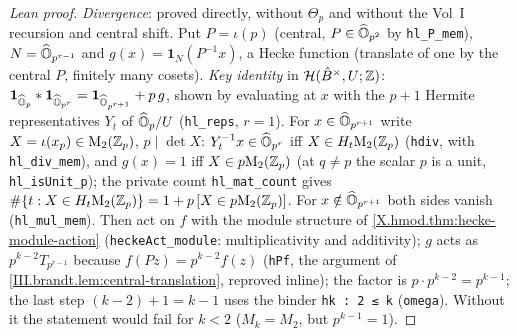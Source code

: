 \begin{proof}[Lean proof]
\emph{Divergence}: proved directly, without $\Theta_p$ and without the Vol~I recursion and central shift. Put $P=\iota(p)$ (central, $P\in\widehat{\mathbb{O}}_{p^2}$ by \texttt{hl\_P\_mem}), $N=\widehat{\mathbb{O}}_{p^{r-1}}$ and $g(x)=\mathbf 1_N(P^{-1}x)$, a Hecke function (translate of one by the central $P$, finitely many cosets). \emph{Key identity} in $\mathcal H(\hat B^\times,U;\mathbb{Z})$: $\mathbf 1_{\widehat{\mathbb{O}}_p}*\mathbf 1_{\widehat{\mathbb{O}}_{p^r}}=\mathbf 1_{\widehat{\mathbb{O}}_{p^{r+1}}}+p\,g$, shown by evaluating at $x$ with the $p+1$ Hermite representatives $Y_t$ of $\widehat{\mathbb{O}}_p/U$ (\texttt{hl\_reps}, $r=1$). For $x\in\widehat{\mathbb{O}}_{p^{r+1}}$ write $X=\iota(x_p)\in\mathrm{M}_2(\mathbb{Z}_p)$, $p\mid\det X$: $Y_t^{-1}x\in\widehat{\mathbb{O}}_{p^r}$ iff $X\in H_t\mathrm{M}_2(\mathbb{Z}_p)$ (\texttt{hdiv}, with \texttt{hl\_div\_mem}), and $g(x)=1$ iff $X\in p\mathrm{M}_2(\mathbb{Z}_p)$ (at $q\neq p$ the scalar $p$ is a unit, \texttt{hl\_isUnit\_p}); the private count \texttt{hl\_mat\_count} gives $\#\{t:X\in H_t\mathrm{M}_2(\mathbb{Z}_p)\}=1+p\,[X\in p\mathrm{M}_2(\mathbb{Z}_p)]$. For $x\notin\widehat{\mathbb{O}}_{p^{r+1}}$ both sides vanish (\texttt{hl\_mul\_mem}). Then act on $f$ with the module structure of \cref{X.hmod.thm:hecke-module-action} (\texttt{heckeAct\_module}: multiplicativity and additivity); $g$ acts as $p^{k-2}T_{p^{r-1}}$ because $f(Pz)=p^{k-2}f(z)$ (\texttt{hPf}, the argument of \cref{III.brandt.lem:central-translation}, reproved inline); the factor is $p\cdot p^{k-2}=p^{k-1}$; the last step $(k-2)+1=k-1$ uses the binder \texttt{hk : 2 ≤ k} (\texttt{omega}). Without it the statement would fail for $k<2$ ($M_k=M_2$, but $p^{k-1}=1$).
\end{proof}


